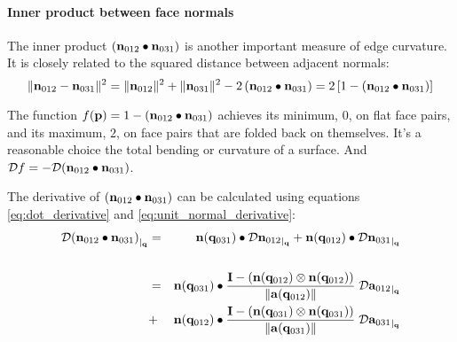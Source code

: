 
\paragraph{Inner product between face normals}
\label{sec:normal_dot}

The inner product $\left( {\mathbf n}_{012} \bullet {\mathbf n}_{031} \right)$
is another important measure of edge curvature.
It is closely related to the squared distance between adjacent normals:
\begin{equation}
\label{eq:normal-distance-dot}
\| {\mathbf n}_{012} - {\mathbf n}_{031} \|^2
= \| {\mathbf n}_{012} \|^2
+ \| {\mathbf n}_{031} \|^2
- 2 \left( {\mathbf n}_{012} \bullet {\mathbf n}_{031} \right)
= 2 \left[ 1 - \left( {\mathbf n}_{012} \bullet {\mathbf n}_{031} \right) \right]
\end{equation}

The function $f({\mathbf p}) = 1 - \left( {\mathbf n}_{012} \bullet {\mathbf n}_{031} \right)$
achieves its minimum, $0$, on flat face pairs,
and its maximum, $2$, on face pairs that are folded back on themselves.
It's a reasonable choice the total bending or curvature of a surface.
And ${\mathcal{D}{f}} = - {\mathcal{D}{\left( {\mathbf n}_{012} \bullet {\mathbf n}_{031} \right)}}$.

The derivative of
$\left( {\mathbf n}_{012} \bullet {\mathbf n}_{031} \right)$
can be calculated using equations \ref{eq:dot_derivative} and
\ref{eq:unit_normal_derivative}:
\begin{eqnarray}
\label{normal_dot_derivative}
{\mathcal{D}{\left( {\mathbf n}_{012} \bullet {\mathbf n}_{031} \right)}_{\mid_{{\mathbf q}}}}
& = & {\mathbf n}({\mathbf q}_{031}) \bullet {\mathcal{D}{{\mathbf n}_{012}}_{\mid_{{\mathbf q}}}} + {\mathbf n}({\mathbf q}_{012}) \bullet {\mathcal{D}{{\mathbf n}_{031}}_{\mid_{{\mathbf q}}}}
\\
\nonumber \\
& = &
{\mathbf n}({\mathbf q}_{031}) \bullet
{{{\mathbf I}- \left({\mathbf n}({\mathbf q}_{012}) \otimes {\mathbf n}({\mathbf q}_{012}) \right)} \over {\| {\mathbf a}({\mathbf q}_{012}) \|}}
\; {\mathcal{D}{{\mathbf a}_{012}}_{\mid_{{\mathbf q}}}}
\nonumber \\
& + &
{\mathbf n}({\mathbf q}_{012}) \bullet
{{{\mathbf I}- \left({\mathbf n}({\mathbf q}_{031}) \otimes {\mathbf n}({\mathbf q}_{031}) \right)} \over {\| {\mathbf a}({\mathbf q}_{031}) \|}}
\; {\mathcal{D}{{\mathbf a}_{031}}_{\mid_{{\mathbf q}}}}
\nonumber
\end{eqnarray}

